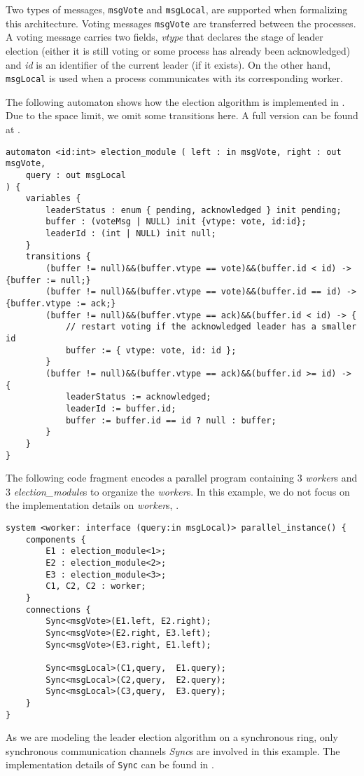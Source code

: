 Two types of messages, \texttt{msgVote} and \texttt{msgLocal}, are supported when formalizing this architecture. Voting messages \texttt{msgVote} are transferred between the processes. A voting message carries two fields, \emph{vtype} that declares the stage of leader election (either it is still voting or some process has already been acknowledged) and \emph{id} is an identifier of the current leader (if it exists). On the other hand, \texttt{msgLocal} is used when a process communicates with its corresponding worker.
\begin{example} The following automaton shows how the election algorithm is implemented in \lang{}. Due to the space limit, we omit some transitions here. A full version can be found at \cite{medmodels}.
\begin{lstlisting}[basicstyle=\scriptsize\ttfamily]
automaton <id:int> election_module ( left : in msgVote, right : out msgVote,
	query : out msgLocal
) {
	variables {
		leaderStatus : enum { pending, acknowledged } init pending;
		buffer : (voteMsg | NULL) init {vtype: vote, id:id};
		leaderId : (int | NULL) init null;
	}
	transitions {
		(buffer != null)&&(buffer.vtype == vote)&&(buffer.id < id) -> {buffer := null;}
		(buffer != null)&&(buffer.vtype == vote)&&(buffer.id == id) -> {buffer.vtype := ack;}
		(buffer != null)&&(buffer.vtype == ack)&&(buffer.id < id) -> {
			// restart voting if the acknowledged leader has a smaller id
			buffer := { vtype: vote, id: id };
		}
		(buffer != null)&&(buffer.vtype == ack)&&(buffer.id >= id) -> {
			leaderStatus := acknowledged;
			leaderId := buffer.id;
			buffer := buffer.id == id ? null : buffer;
		}
	}
}
\end{lstlisting}
\end{example}


The following code fragment encodes a parallel program containing 3 \emph{worker}s and 3 \emph{election\_module}s to organize the \emph{worker}s.  In this example, we do not focus on the implementation details on \emph{worker}s, . 

\begin{lstlisting}[basicstyle=\scriptsize\ttfamily]
system <worker: interface (query:in msgLocal)> parallel_instance() {
	components {
		E1 : election_module<1>;
		E2 : election_module<2>;
		E3 : election_module<3>;
		C1, C2, C2 : worker;
	}	
	connections {
		Sync<msgVote>(E1.left, E2.right);
		Sync<msgVote>(E2.right, E3.left);
		Sync<msgVote>(E3.right,	E1.left);
		
		Sync<msgLocal>(C1,query,  E1.query);
		Sync<msgLocal>(C2,query,  E2.query);
		Sync<msgLocal>(C3,query,  E3.query);
	}
}
\end{lstlisting}

As we are modeling the leader election algorithm on a synchronous ring, only synchronous communication channels \emph{Sync}s are involved in this example. The implementation details of \texttt{Sync} can be found in  \cite{medmodels}.